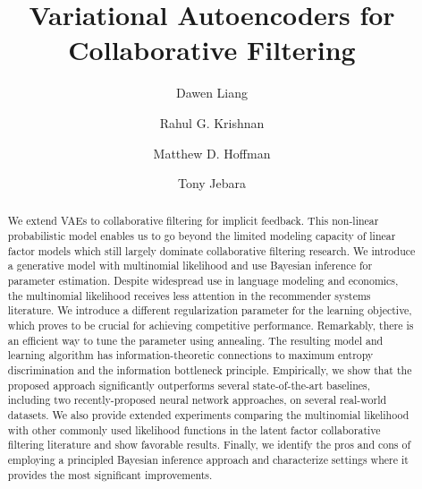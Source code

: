 \documentclass[sigconf]{acmart}
\begin{document}
\title{Variational Autoencoders for Collaborative Filtering}

\author{Dawen Liang}

\author{Rahul G. Krishnan}

\author{Matthew D. Hoffman}

\author{Tony Jebara}

\renewcommand{\shortauthors}{D. Liang et al.}

\begin{abstract}

We extend \glspl{VAE} to collaborative filtering for implicit feedback. This 
non-linear probabilistic model enables us to go beyond the limited modeling capacity of 
linear factor models which still largely dominate collaborative filtering research.
We introduce a generative model with multinomial likelihood 
and use Bayesian inference for parameter estimation. 
Despite widespread use in language modeling and economics, the multinomial 
likelihood receives less attention in the recommender systems literature. 
We introduce a different 
regularization parameter for the learning objective, which proves to be crucial for achieving competitive performance.
Remarkably, there is an efficient way to tune the parameter using annealing. 
The resulting model and learning algorithm has information-theoretic connections to maximum entropy discrimination and the information bottleneck principle.
Empirically, we show that the proposed approach significantly outperforms several state-of-the-art baselines,
including two recently-proposed neural network approaches, on several real-world datasets.
We also provide extended experiments comparing the multinomial likelihood with other commonly 
used likelihood functions in the latent factor collaborative filtering literature and show 
favorable results. Finally, we identify the pros and cons of employing a principled Bayesian 
inference approach and characterize settings where it provides the most significant improvements.
\end{abstract} 


\end{document}
